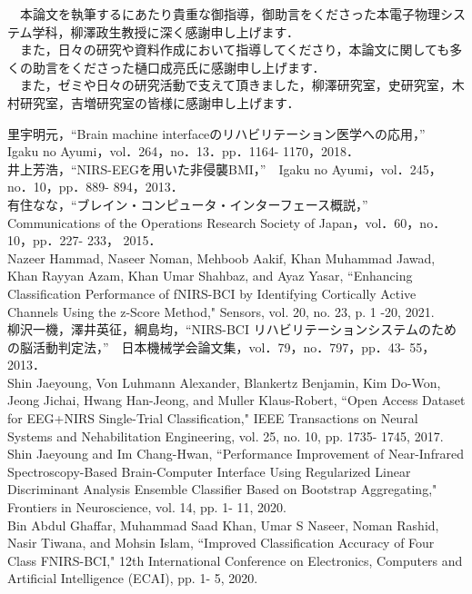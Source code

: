 \documentclass[a4j,12pt]{jreport}
\begin{document}
\gratitude
　本論文を執筆するにあたり貴重な御指導，御助言をくださった本電子物理システム学科，柳澤政生教授に深く感謝申し上げます．\\
　また，日々の研究や資料作成において指導してくださり，本論文に関しても多くの助言をくださった樋口成亮氏に感謝申し上げます．\\
　また，ゼミや日々の研究活動で支えて頂きました，柳澤研究室，史研究室，木村研究室，吉増研究室の皆様に感謝申し上げます．\\
\begin{thebibliography}{99}
里宇明元，“Brain machine interfaceのリハビリテーション医学への応用，”　Igaku no Ayumi，vol．264，no．13．pp．1164- 1170，2018．\\
井上芳浩，“NIRS-EEGを用いた非侵襲BMI，”　Igaku no Ayumi，vol．245，no．10，pp．889- 894，2013．\\
有住なな，“ブレイン・コンピュータ・インターフェース概説，”　Communications of the Operations Research Society of Japan，vol．60，no．10，pp．227- 233， 2015．\\
Nazeer Hammad, Naseer Noman, Mehboob Aakif, Khan Muhammad Jawad, Khan Rayyan Azam, Khan Umar Shahbaz, and Ayaz Yasar, ``Enhancing Classification Performance of fNIRS-BCI by Identifying Cortically Active Channels Using the z-Score Method," Sensors, vol. 20, no. 23, p. 1 -20, 2021.\\
柳沢一機，澤井英征，綱島均，“NIRS-BCI リハビリテーションシステムのための脳活動判定法，”　日本機械学会論文集，vol．79，no．797，pp．43- 55，2013．\\
Shin Jaeyoung, Von Luhmann Alexander, Blankertz Benjamin, Kim Do-Won, Jeong Jichai, Hwang Han-Jeong, and Muller Klaus-Robert, ``Open Access Dataset for EEG+NIRS Single-Trial Classification," IEEE Transactions on Neural Systems and Nehabilitation Engineering, vol. 25, no. 10, pp. 1735- 1745, 2017.\\
Shin Jaeyoung and Im Chang-Hwan, ``Performance Improvement of Near-Infrared Spectroscopy-Based Brain-Computer Interface Using Regularized Linear Discriminant Analysis Ensemble Classifier Based on Bootstrap Aggregating," Frontiers in Neuroscience, vol. 14, pp. 1- 11, 2020.\\
Bin Abdul Ghaffar, Muhammad Saad Khan, Umar S Naseer, Noman Rashid, Nasir Tiwana, and Mohsin Islam, ``Improved Classification Accuracy of Four Class FNIRS-BCI," 12th International Conference on Electronics, Computers and Artificial Intelligence (ECAI), pp. 1- 5, 2020.\\

\end{thebibliography}
\end{document}
